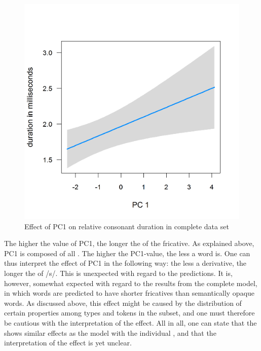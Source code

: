 \begin{figure}
	
	\includegraphics [scale=0.4] {images/Corpus/disPCAbsPC4.png}
	\caption{Effect of PC1 on relative consonant duration in complete data set}
	\label{fig:PC1 dis Corpus}
\end{figure}


The higher the value of \textsc{PC1}, the longer the  of the fricative. As explained above, \textsc{PC1} is composed of all . The higher the \textsc{PC1}-value, the less  a word is.
 One can thus interpret the effect of \textsc{PC1} in the following way: the less  a derivative, the longer the  of /s/. This is unexpected with regard to the  predictions. It is, however, somewhat expected with regard to the results from the complete  model, in which  words are predicted to have shorter fricatives than semantically opaque words. As discussed above, this effect might be caused by the distribution of certain properties among types and tokens in the subset, and one must therefore be cautious with the interpretation of the effect. All in all, one can state that the  shows similar effects as the model with the individual , and that the interpretation of the  effect is yet unclear.






